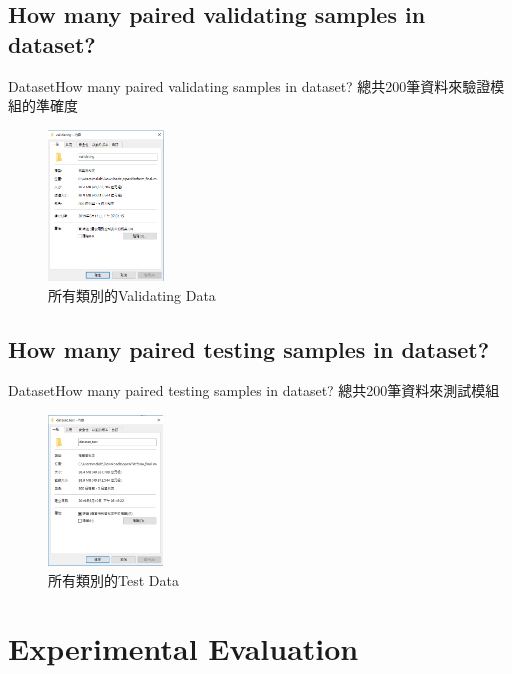 \documentclass{beamer}
\begin{document}
\begin{CJK}{UTF8}{nkai}
\subsection{How many paired validating samples in dataset?}
\begin{frame}{Dataset}{How many paired validating samples in  dataset?}
總共200筆資料來驗證模組的準確度
\newline
\newline
\begin{figure}
\begin{center} 
\includegraphics[height=4cm]{7.png}
\end{center}
\caption{所有類別的Validating Data}
\end{figure}
\end{frame}
\subsection{How many paired testing samples in  dataset?}
\begin{frame}{Dataset}{How many paired testing samples in  dataset?}
總共200筆資料來測試模組
\newline
\newline
\begin{figure}
\begin{center} 
\includegraphics[height=4cm]{6.png}
\end{center}
\caption{所有類別的Test Data}
\end{figure}
\end{frame}
\section{Experimental Evaluation}

\end{CJK}
\end{document}
